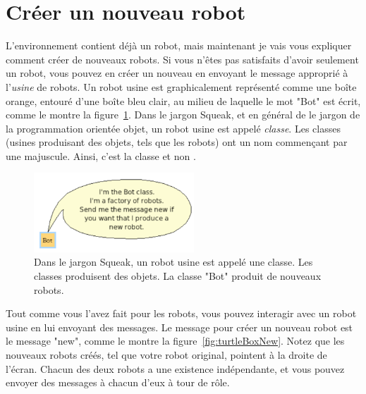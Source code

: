 \documentclass[a4paper,10pt,twoside]{book}
\begin{document}



\section{Cr\'eer un nouveau robot}
L'environnement contient d\'ej\`a un robot, mais maintenant je vais vous expliquer comment cr\'eer de nouveaux robots. Si vous n'\^etes pas satisfaits d'avoir seulement un robot, vous pouvez en cr\'eer un nouveau en envoyant le message appropri\'e \`a l'\emph{usine} de robots. Un robot usine est graphicalement repr\'esent\'e comme une bo\^ite orange, entour\'e d'une bo\^ite bleu clair, au milieu de laquelle le mot "Bot" est \'ecrit, comme le montre la figure~\ref{fig:classBalloon}. Dans le jargon Squeak, et en g\'en\'eral de le jargon de la programmation orient\'ee objet, un robot usine est appel\'e \emph{classe}. Les classes (usines produisant des objets, tels que les robots) ont un nom commen\c cant par une majuscule. Ainsi, c'est la classe  et non .

\begin{figure}[!h]\centerline{\includegraphics[width=6cm]{14-classBalloon2}}
\caption{Dans le jargon Squeak, un robot usine est appel\'e une classe. Les classes produisent des objets. La classe "Bot" produit de nouveaux robots. 
 \label{fig:classBalloon}}
\end{figure}

Tout comme vous l'avez fait pour les robots, vous pouvez interagir avec un robot usine en lui envoyant des messages. Le message pour cr\'eer un nouveau robot est le message "new", comme le montre la figure~\ref{fig:turtleBoxNew}. Notez que les nouveaux robots cr\'e\'es, tel que votre robot original, pointent \`a la droite de l'\'ecran. Chacun des deux robots a une existence ind\'ependante, et vous pouvez envoyer des messages \`a chacun d'eux \`a tour de r\^ole. 
\end{document}
